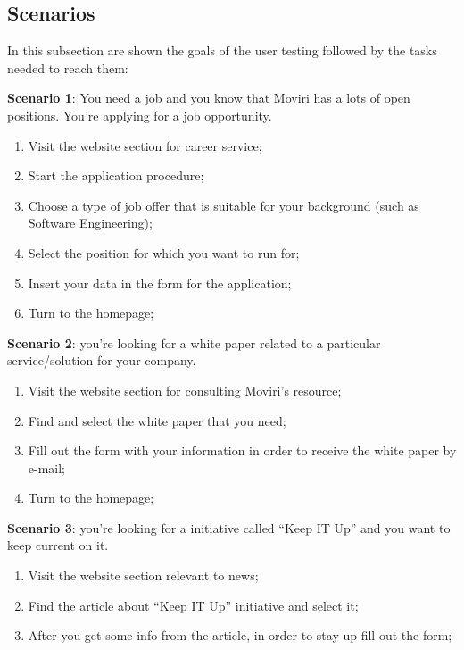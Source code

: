 \subsection{Scenarios}
In this subsection are shown the goals of the user testing followed by the tasks needed to reach them:\par
\textbf{Scenario 1}: You need a job and you know that Moviri has a lots of open positions. You’re applying for a job opportunity.
\begin{enumerate}
\item Visit the website section for career service;
\item Start the application procedure;
\item Choose a type of job offer that is suitable for your background (such as Software Engineering); 
\item Select the position for which you want to run for;
\item Insert your data in the form for the application;
\item Turn to the homepage;
\end{enumerate}\par
\textbf{Scenario 2}: you’re looking for a white paper related to a particular service/solution for your company.
\begin{enumerate}
\item Visit the website section for consulting Moviri’s resource;
\item Find and select the white paper that you need;
\item Fill out the form with your information in order to receive the white paper by e-mail;
\item Turn to the homepage;
\end{enumerate}\par
\textbf{Scenario 3}: you’re looking for a initiative called “Keep IT Up” and you want to keep current on it.
\begin{enumerate}
\item Visit the website section relevant to news;
\item Find the article about “Keep IT Up” initiative and select it;
\item After you get some info from the article, in order to stay up fill out the form;
\end{enumerate}\par

